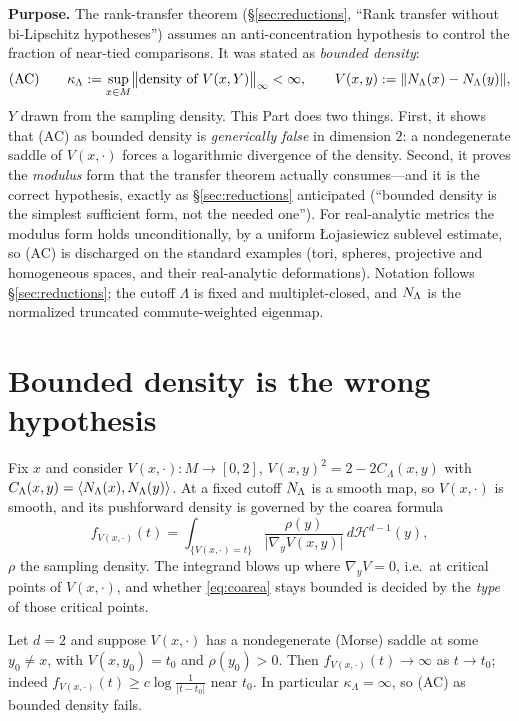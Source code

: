 
\noindent\textbf{Purpose.} The rank-transfer theorem (\S\ref{sec:reductions},
``Rank transfer without bi-Lipschitz hypotheses'') assumes an anti-concentration
hypothesis to control the fraction of near-tied comparisons. It was stated as
\emph{bounded density}:
\[
\text{(AC)}\qquad \kappa_\Lambda:=\sup_{x\in M}\bigl\lVert\text{density of }V(x,Y)\bigr\rVert_\infty<\infty,
\qquad V(x,y):=\lVert N_\Lambda(x)-N_\Lambda(y)\rVert,
\]
$Y$ drawn from the sampling density. This Part does two things. First, it shows that
(AC) as bounded density is \emph{generically false} in dimension $2$: a nondegenerate
saddle of $V(x,\cdot)$ forces a logarithmic divergence of the density. Second, it proves
the \emph{modulus} form that the transfer theorem actually consumes---and it is the
correct hypothesis, exactly as \S\ref{sec:reductions} anticipated (``bounded density is the
simplest sufficient form, not the needed one''). For real-analytic metrics the modulus
form holds unconditionally, by a uniform \L ojasiewicz sublevel estimate, so (AC) is
discharged on the standard examples (tori, spheres, projective and homogeneous spaces,
and their real-analytic deformations). Notation follows \S\ref{sec:reductions}; the cutoff
$\Lambda$ is fixed and multiplet-closed, and $N_\Lambda$ is the normalized truncated
commute-weighted eigenmap.

\section{Bounded density is the wrong hypothesis}

Fix $x$ and consider $V(x,\cdot):M\to[0,2]$, $V(x,y)^2=2-2C_\Lambda(x,y)$ with
$C_\Lambda(x,y)=\langle N_\Lambda(x),N_\Lambda(y)\rangle$. At a fixed cutoff $N_\Lambda$ is a smooth map,
so $V(x,\cdot)$ is smooth, and its pushforward density is governed by the coarea formula
\begin{equation}\label{eq:coarea}
f_{V(x,\cdot)}(t)=\int_{\{V(x,\cdot)=t\}}\frac{\rho(y)}{\lvert\nabla_y V(x,y)\rvert}\,d\mathcal H^{d-1}(y),
\end{equation}
$\rho$ the sampling density. The integrand blows up where $\nabla_y V=0$, i.e.\ at
critical points of $V(x,\cdot)$, and whether \eqref{eq:coarea} stays bounded is decided
by the \emph{type} of those critical points.

\begin{proposition}[Saddles break bounded density in $d=2$]\label{prop:saddle}
Let $d=2$ and suppose $V(x,\cdot)$ has a nondegenerate (Morse) saddle at some
$y_0\ne x$, with $V(x,y_0)=t_0$ and $\rho(y_0)>0$. Then $f_{V(x,\cdot)}(t)\to\infty$ as
$t\to t_0$; indeed $f_{V(x,\cdot)}(t)\ge c\log\frac1{\lvert t-t_0\rvert}$ near $t_0$. In
particular $\kappa_\Lambda=\infty$, so (AC) as bounded density fails.
\end{proposition}

